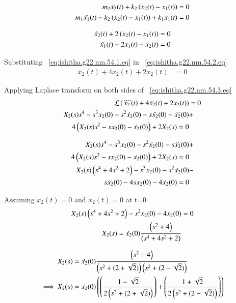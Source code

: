 \documentclass[journal,12pt,twocolumn]{IEEEtran}
\theoremstyle{remark}
\begin{document}
\begin{align}
m_2\ddot{x_2}(t) + k_2\left(x_2(t)-x_1(t)\right)&=0 \\
m_1\ddot{x_1}(t) - k_2\left(x_2(t)-x_1(t)\right)+ k_1x_1(t)&=0
\end{align}

\begin{align}
\ddot{x_2}(t) + 2\left(x_2(t)-x_1(t)\right) &= 0 
\label{eq:ishitha.g22.nm.54.1.eq} \\
\ddot{x_1}(t) +2x_1(t)- x_2(t) &=0 
\label{eq:ishitha.g22.nm.54.2.eq}
\end{align}

Substituting  ~\eqref{eq:ishitha.g22.nm.54.1.eq} in  ~\eqref{eq:ishitha.g22.nm.54.2.eq}
\begin{align}
\ddddot{x_2}(t) + 4\ddot{x_2}(t) + 2x_2(t) &= 0 
\label{eq:ishitha.g22.nm.54.3.eq}
\end{align}

Applying Laplace transform on both sides of ~\eqref{eq:ishitha.g22.nm.54.3.eq}
\begin{align}
\mathcal{L}\left(\ddddot{x_2}(t) + 4\ddot{x_2}(t) + 2x_2(t)\right) &= 0 \\
X_2(s)s^4 - s^3 x_2(0) - s^2 \dot{x_2}(0) -s\ddot{x_2}(0)-\dddot{x_2}(0) &+\nonumber \\ 4\left(X_2(s)s^2-sx_2(0)-\dot{x_2}(0)\right) + 2X_2(s) =0
\end{align}

\begin{align}
X_2(s)s^4 - s^3 x_2(0) - s^2 \dot{x_2}(0)-s\ddot{x_2}(0) &+\nonumber \\ 4\left(X_2(s)s^2-sx_2(0)-\dot{x_2}(0)\right) +  2X_2(s) =0\\
X_2(s)\left(s^4 + 4s^2 +2\right)  - s^3 x_2(0) -  s^2\dot{x_2}(0)&- \nonumber \\s\ddot{x_2}(0) -4sx_2(0)-4\dot{x_2}(0)=0
\end{align}

Assuming  $x_2(t) = 0$ and $\ddot x_2(t) = 0$  at t=0
\begin{align}
X_2(s)\left(s^4 + 4s^2 +2\right)-  s^2\dot{x_2}(0) -4\dot{x_2}(0) &= 0 \\
X_2(s) = \dot{x_2}(0)\frac{\left(s^2+4\right)}{\left(s^4 + 4s^2 +2\right)} 
\end{align}


\begin{align}
X_2(s) &= \dot{x_2}(0)\frac{\left(s^2+4\right)}{\left(s^2 +(2+\sqrt{2})\right)\left(s^2 +(2-\sqrt{2})\right)} \\
\implies X_2(s) &= \dot{x_2}(0)\left(\left(\frac{1-\sqrt{2}}{2\left(s^2 +(2+\sqrt{2})\right)}\right)+\left(\frac{1+\sqrt{2}}{2\left(s^2+(2-\sqrt{2})\right)}\right)\right)
\label{eq:ishitha.g22.nm.54.4.eq}
\end{align}
\end{document}
